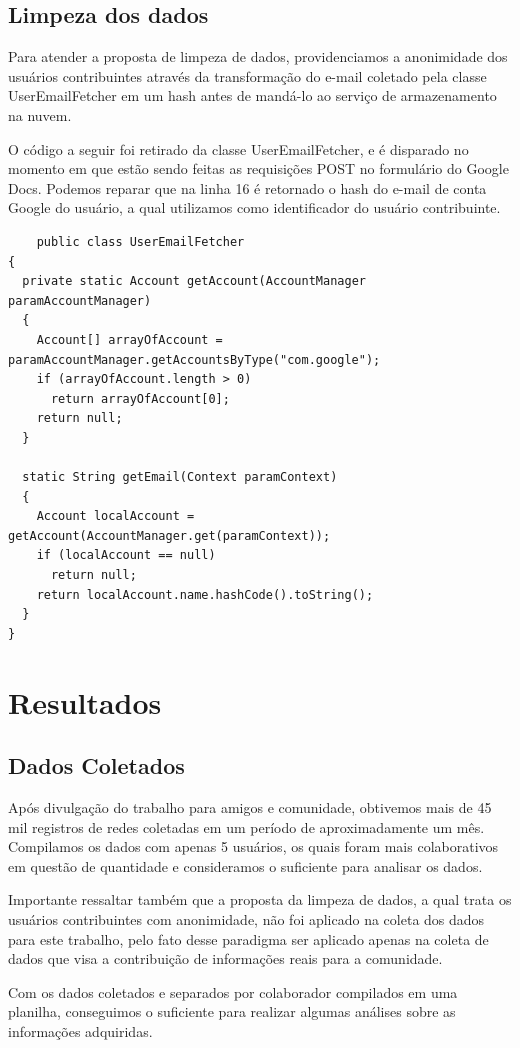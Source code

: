 \documentclass[12pt, %
openright, 
oneside,
a4paper,
brazil]{facom-ufu-abntex2}
\begin{document}
\section{Limpeza dos dados}
Para atender a proposta de limpeza de dados, providenciamos a anonimidade dos usuários contribuintes através da transformação do e-mail coletado pela classe UserEmailFetcher em um hash antes de mandá-lo ao serviço de armazenamento na nuvem.

O código a seguir foi retirado da classe UserEmailFetcher, e é disparado no momento em que estão sendo feitas as requisições POST no formulário do Google Docs. Podemos reparar que na linha 16 é retornado o hash do e-mail de conta Google do usuário, a qual utilizamos como identificador do usuário contribuinte.

\begin{lstlisting}
	public class UserEmailFetcher
{
  private static Account getAccount(AccountManager paramAccountManager)
  {
    Account[] arrayOfAccount = paramAccountManager.getAccountsByType("com.google");
    if (arrayOfAccount.length > 0)
      return arrayOfAccount[0];
    return null;
  }

  static String getEmail(Context paramContext)
  {
    Account localAccount = getAccount(AccountManager.get(paramContext));
    if (localAccount == null)
      return null;
    return localAccount.name.hashCode().toString();
  }
}
\end{lstlisting}


\chapter{Resultados}
\section{Dados Coletados}
Após divulgação do trabalho para amigos e comunidade, obtivemos mais de 45 mil registros de redes coletadas em um período de aproximadamente um mês. Compilamos os dados com apenas 5 usuários, os quais foram mais colaborativos em questão de quantidade e consideramos o suficiente para analisar os dados.

Importante ressaltar também que a proposta da limpeza de dados, a qual trata os usuários contribuintes com anonimidade, não foi aplicado na coleta dos dados para este trabalho, pelo fato desse paradigma ser aplicado apenas na coleta de dados que visa a contribuição de informações reais para a comunidade.

Com os dados coletados e separados por colaborador compilados em uma planilha, conseguimos o suficiente para realizar algumas análises sobre as informações adquiridas. 
\end{document}
